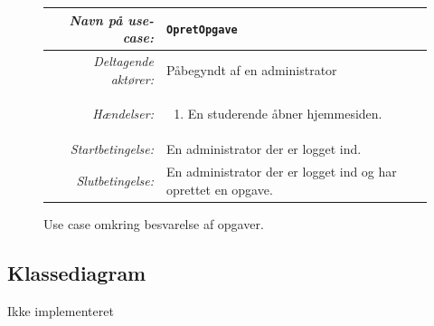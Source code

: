 \documentclass[12pt]{article}
\begin{document}
\begin{figure}[htpb]
    \centering
    \begin{tabular}{r p{10cm}}
        \toprule
        \textit{Navn på use-case:} & \verb!OpretOpgave! \\
        \hline
        \textit{Deltagende aktører:} & Påbegyndt af en administrator \\
        \hline
        \textit{Hændelser:} & \begin{enumerate}[nolistsep]
            \item En studerende åbner hjemmesiden.
        \end{enumerate}  \\
        \hline
        \textit{Startbetingelse:} & En administrator der er logget ind. \\
        \hline
        \textit{Slutbetingelse:} & En administrator der er logget ind og har oprettet en opgave. \\
        \bottomrule
    \end{tabular}
    \caption{Use case omkring besvarelse af opgaver.}
    \label{fig:use_case1}
\end{figure}

\subsection{Klassediagram}
Ikke implementeret
\end{document}
